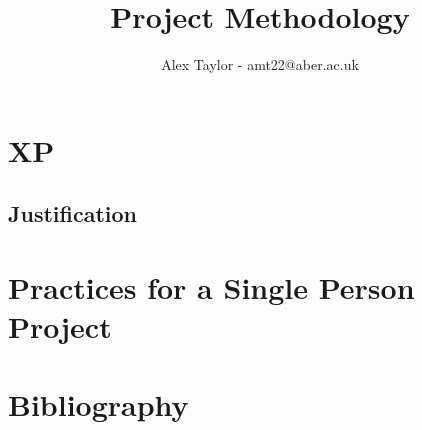 \documentclass{article}
\title{Project Methodology}
\author{Alex Taylor - amt22@aber.ac.uk}
\begin{document}
\maketitle
\tableofcontents

\newpage

\section{XP}
\subsection{Justification}
\newpage
\section{Practices for a Single Person Project}
\newpage
\section{Bibliography}
\end{document}
